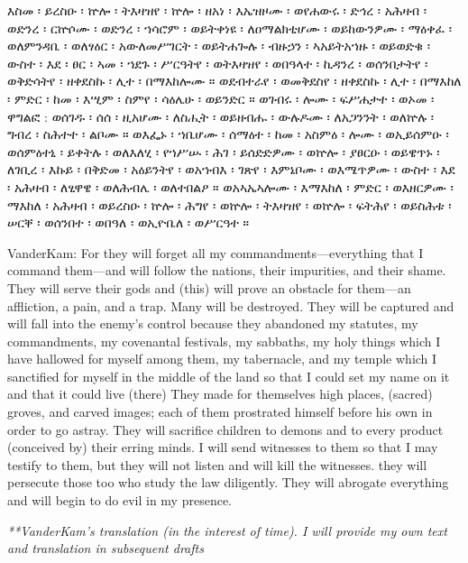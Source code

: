 \begin{ethiopictext}
    እስመ ፡ ይረስዑ ፡ ኵሎ ፡ ትእዛዝየ ፡ 
    ኵሎ ፡ ዘአነ ፡ እኤዝዞሙ ፡ ወየሐውሩ ፡ ድኅረ ፡ አሕዛብ ፡ ወድንረ ፡
    ርኵሶሙ ፡ ወድንረ ፡ ኀሳሮም ፡ ወይትቀነዩ ፡ ለዐማልክቲሆሙ ፡ 
    ወይከውንዎሙ ፡ ማዕቀፈ ፡ ወለምንዳቤ ፡ ወለፃዕር ፡ አውለመሥገርት ፡
    ወይትሐጐሉ ፡ ብዙኃን ፡ ኣአይትአኀዙ ፡ ወይወድቁ ፡ ውስተ ፡
    እደ ፡ ፀር ፡ ኣመ ፡ ኀደጉ ፡ ሥርዓትየ ፡ ወትእዛዝየ ፡ ወበዓላተ ፡
    ኪዳንረ ፡ ወሰንበታትየ ፡ ወቅድሳትየ ፡ ዘቀደስኩ ፡ ሊተ ፡ በማእከሎሙ ።
    ወደብተራየ ፡ ወመቅደስየ ፡ ዘቀደስኩ ፡ ሊተ ፡ በማእከለ ፡
    ምድር ፡ ከመ ፡ እሢም ፡ ስምየ ፡ ሳዕሌሁ ፡ ወይንድር ።
    ወገብሩ ፡
    ሎሙ ፡ ፍሥሐታተ ፡ ወኦመ ፡ ዋግልፎ : ወሰገዱ ፡ ሰሰ ፡ ዚአሆሙ ፡ 
    ለስሒት ፡ ወይዘብሑ ፡ ውሉዶሙ ፡ ለአጋንንት ፡ ወለኵሉ ፡ ግብረ ፡
    ስሕተተ ፡ ልቦሙ ።
    ወእፌኑ ፡ ኀቤሆሙ ፡ ሰማዕተ ፡ ከመ ፡
    አስምዕ ፡ ሎሙ ፡ ወኢይሰምዑ ፡ ወሰምዕተኒ ፡ ይቀትሉ ፡ ወለእለሂ ፡
    የኀሥሡ ፡ ሕገ ፡ ይሰድድዎሙ ፡ ወኵሎ ፡ ያፀርዑ ፡ ወይዌጥኑ ፡ ለገቢረ ፡
    እኩይ ፡ በቅድመ ፡ አዕይንትየ ፡
    ወአኀብእ ፡ ገጽየ ፡
    እምኔቦሙ ፡ ወእሜጥዎሙ ፡ ውስተ ፡ እደ ፡ አሕዛብ ፡ ለፂዋዌ ፡
    ወለሕብሌ ፡ ወለተበልዖ ። ወአኣኤኣሎሙ ፡ እማእከለ ፡ ምድር ፡
    ወእዘርዎሙ ፡ ማእከለ ፡ አሕዛብ ፡
    ወይረስዑ ፡ ኵሎ ፡ ሕግየ ፡
    ወኵሎ ፡ ትእዛዝየ ፡ ወኵሎ ፡ ፍትሕየ ፡ ወይስሕቱ ፡ ሠርቐ ፡ ወሰንበተ ፡
    ወበዓለ ፡ ወኢዮቤለ ፡ ወሥርዓተ ።
\end{ethiopictext}



\begin{transliteration}
\end{transliteration}

\begin{translation}
    VanderKam: For they will forget all my commandments---everything that I command them---and will follow the nations, their impurities, and their shame. They will serve their gods and (this) will prove an obstacle for them---an affliction, a pain, and a trap.
    Many will be destroyed. They will be captured and will fall into the enemy's control because they abandoned my statutes, my commandments, my covenantal festivals, my sabbaths, my holy things which I have hallowed for myself among them, my tabernacle, and my temple which I sanctified for myself in the middle of the land so that I could set my name on it and that it could live (there)
    They  made for themselves high places, (sacred) groves, and carved images; each of them prostrated himself before his own in  order to go astray. They will sacrifice children to demons and to every product (conceived by) their erring minds.
    I will send witnesses to them so that I may testify to them, but they will not listen and will kill the witnesses. they will persecute those too who study the law diligently. They will abrogate everything and will begin to do evil in my presence.

    \emph{**VanderKam's translation (in the interest of time). I will provide my own text and translation in subsequent drafts}
\end{translation}